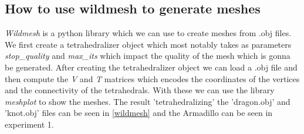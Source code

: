 \subsection{How to use wildmesh to generate meshes}
\textit{Wildmesh} is a python library which we can use to create meshes from .obj files. We first create a tetrahedralizer object which most notably takes as parameters \textit{stop\_quality} and \textit{max\_its} which impact the quality of the mesh which is gonna be generated. After creating the tetrahedralizer object we can load a .obj file and then compute the \textit{V} and \textit{T} matrices which encodes the coordinates of the vertices and the connectivity of the tetrahedrals. With these we can use the library \textit{meshplot} to show the meshes. The result 'tetrahedralizing' the 'dragon.obj' and 'knot.obj' files can be seen in \autoref{wildmesh} and the Armadillo can be seen in experiment 1.
